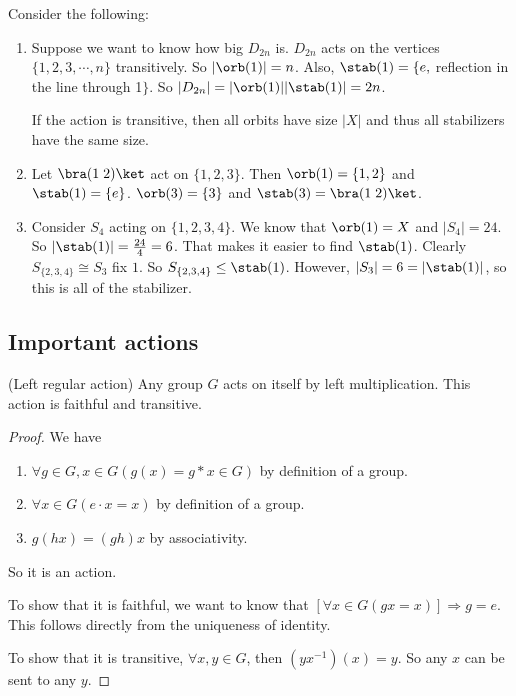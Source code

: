 \documentclass[a4paper]{article}
\begin{document}
  \begin{eg}
    Consider the following:
    \begin{enumerate}
      \item Suppose we want to know how big $D_{2n}$ is. $D_{2n}$ acts on the vertices $\{1, 2, 3, \cdots, n\}$ transitively. So $|\orb(1)| = n$. Also, $\stab(1) =\{e, $ reflection in the line through 1$\}$. So $|D_{2n}| = |\orb(1)||\stab(1)| = 2n$.

        \note If the action is transitive, then all orbits have size $|X|$ and thus all stabilizers have the same size.
      \item Let $\bra (1\; 2)\ket$ act on $\{1, 2, 3\}$. Then $\orb(1) = \{1, 2\}$ and $\stab(1) = \{e\}$. $\orb(3) = \{3\}$ and $\stab(3) = \bra(1\; 2)\ket$.
      \item Consider $S_4$ acting on $\{1, 2, 3, 4\}$. We know that $\orb(1) = X$ and $|S_4| = 24$. So $|\stab(1)| = \frac{24}{4} = 6$. That makes it easier to find $\stab(1)$. Clearly $S_{\{2, 3, 4\}} \cong S_3$ fix $1$. So $S_{\{2, 3, 4\}}\leq \stab(1)$. However, $|S_3| = 6 = |\stab(1)|$, so this is all of the stabilizer.
    \end{enumerate}
  \end{eg}

  \subsection{Important actions}
  \begin{lemma}
    (Left regular action) Any group $G$ acts on itself by left multiplication. This action is faithful and transitive.
  \end{lemma}
  \begin{proof}
    We have
    \begin{enumerate}[label=\arabic{*}.]
      \item $\forall g\in G, x\in G(g(x) = g*x \in G)$ by definition of a group.
      \item $\forall x\in G(e\cdot x = x)$ by definition of a group.
      \item $g(hx) = (gh)x$ by associativity.
    \end{enumerate}
    So it is an action.

    To show that it is faithful, we want to know that $[\forall x\in G(gx = x)]\Rightarrow g = e$. This follows directly from the uniqueness of identity.

    To show that it is transitive, $\forall x, y\in G$, then $(yx^{-1})(x) = y$. So any $x$ can be sent to any $y$.
  \end{proof}
\end{document}
